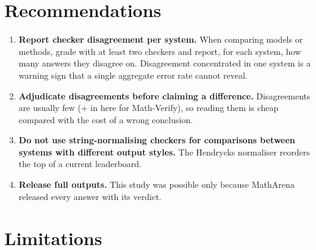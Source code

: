 \documentclass[11pt]{article}
\begin{document}
\section{Recommendations}

\begin{enumerate}
  \item \textbf{Report checker disagreement per system.} When comparing models or methods, grade with at least two checkers and report, for each system, how many answers they disagree on. Disagreement concentrated in one system is a warning sign that a single aggregate error rate cannot reveal.
  \item \textbf{Adjudicate disagreements before claiming a difference.} Disagreements are usually few (\the\numexpr\mathverifyFN+\mathverifyFP\relax{} in \maAnswers{} here for Math-Verify), so reading them is cheap compared with the cost of a wrong conclusion.
  \item \textbf{Do not use string-normalising checkers for comparisons between systems with different output styles.} The Hendrycks normaliser reorders the top of a current leaderboard.
  \item \textbf{Release full outputs.} This study was possible only because MathArena released every answer with its verdict.
\end{enumerate}

\section{Limitations}\label{sec:limits}
\end{document}
